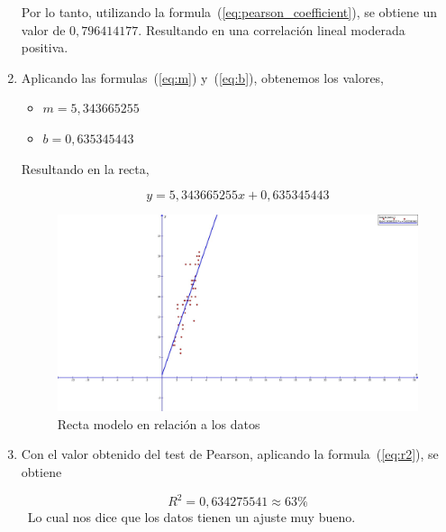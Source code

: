 \documentclass[conference]{IEEEtran}
\begin{document}
\begin{enumerate}
	      Por lo tanto, utilizando la formula~(\ref{eq:pearson_coefficient}),
	      se obtiene un valor de $0,796414177$. Resultando en una correlación
	      lineal moderada positiva.

	\item Aplicando las formulas~(\ref{eq:m}) y~(\ref{eq:b}), obtenemos los
	      valores,

	      \begin{itemize}
		      \item $m = 5,343665255$
		      \item $b = 0,635345443$
	      \end{itemize}

	      Resultando en la recta,

	      \begin{equation*}
		      y = 5,343665255 x + 0,635345443
	      \end{equation*}

	      \begin{figure}[H]
		      \begin{center}
			      \includegraphics[width=\linewidth]{./Images/Recta.jpg}
		      \end{center}
			  \caption{Recta modelo en relación a los datos}
	      \end{figure}

	\item Con el valor obtenido del test de Pearson, aplicando la
	      formula~(\ref{eq:r2}), se obtiene

	      \begin{equation*}
		      R^2 = 0,634275541 \approx 63\%
	      \end{equation*}
	      \
	      Lo cual nos dice que los datos tienen un ajuste muy bueno.

\end{enumerate}


\end{document}
